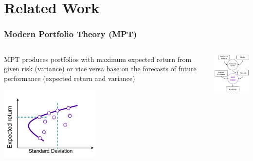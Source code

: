 \section{Related Work}
\begin{frame}
\frametitle{Modern Portfolio Theory (MPT)}
\begin{columns}
\begin{column}{0.55\textwidth}
MPT produces portfolios with maximum expected return from given risk (variance) or vice versa base on the forecasts of future performance (expected return and variance)
\begin{center}
\includegraphics[width=5cm]{images/efficient_frontier.png}
\end{center}
\end{column}
\begin{column}{0.45\textwidth}
\begin{center}
\includegraphics[width=4.8cm]{images/mpt.png}
\end{center}
\end{column}
\end{columns}
\end{frame}



